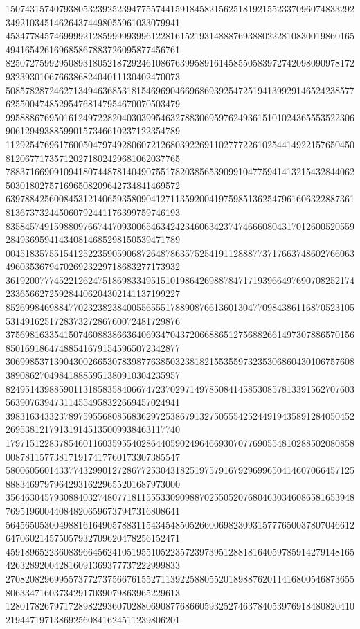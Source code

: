 \begin{DoxyCode}
      150743157407938053239252394775574415918458215625181921552337096074833292349210345146264374498055961033079941
      453477845746999921285999993996122816152193148887693880222810830019860165494165426169685867883726095877456761
      825072759929508931805218729246108676399589161458550583972742098090978172932393010676638682404011130402470073
      508578287246271349463685318154696904669686939254725194139929146524238577625500474852954768147954670070503479
      995888676950161249722820403039954632788306959762493615101024365553522306906129493885990157346610237122354789
      112925476961760050479749280607212680392269110277722610254414922157650450812067717357120271802429681062037765
      788371669091094180744878140490755178203856539099104775941413215432844062503018027571696508209642734841469572
      639788425600845312140659358090412711359200419759851362547961606322887361813673732445060792441176399759746193
      835845749159880976674470930065463424234606342374746660804317012600520559284936959414340814685298150539471789
      004518357551541252235905906872648786357525419112888773717663748602766063496035367947026923229718683277173932
      361920077745221262475186983349515101986426988784717193966497690708252174233656627259284406204302141137199227
      852699846988477023238238400556555178890876613601304770984386116870523105531491625172837327286760072481729876
      375698163354150746088386636406934704372066886512756882661497307886570156850169186474885416791545965072342877
      306998537139043002665307839877638503238182155355973235306860430106757608389086270498418885951380910304235957
      824951439885901131858358406674723702971497850841458530857813391562707603563907639473114554958322669457024941
      398316343323789759556808568362972538679132750555425244919435891284050452269538121791319145135009938463117740
      179715122837854601160359554028644059024964669307077690554810288502080858008781157738171917417760173307385547
      580060560143377432990127286772530431825197579167929699650414607066457125888346979796429316229655201687973000
      356463045793088403274807718115553309098870255052076804630346086581653948769519600440848206596737947316808641
      564565053004988161649057883115434548505266006982309315777650037807046612647060214575057932709620478256152471
      459189652236083966456241051955105223572397395128818164059785914279148165426328920042816091369377737222999833
      270820829699557377273756676155271139225880552018988762011416800546873655806334716037342917039079863965229613
      128017826797172898229360702880690877686605932527463784053976918480820410219447197138692560841624511239806201

\end{DoxyCode}
